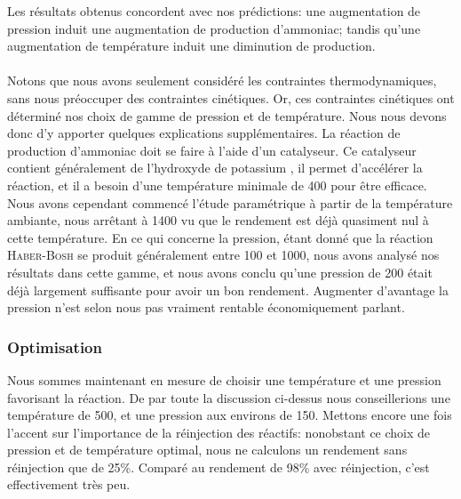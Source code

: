 Les résultats obtenus concordent avec nos prédictions: une augmentation de pression induit une augmentation de production d'ammoniac; tandis qu'une augmentation de température induit une
diminution de production.
\paragraph{} Notons que nous avons seulement considéré les contraintes thermodynamiques, sans nous préoccuper des contraintes
cinétiques. Or, ces contraintes cinétiques ont déterminé nos choix de gamme de pression et de température. Nous nous
devons donc d'y apporter quelques explications supplémentaires.
La réaction de production d'ammoniac doit se faire à l'aide d'un catalyseur. Ce catalyseur contient généralement de
l'hydroxyde de potassium , il permet d'accélérer la réaction, et il a besoin d'une température minimale de \unit{400}{\celsius}
pour être efficace.\cite{ib} Nous avons cependant commencé l'étude paramétrique à partir de la température ambiante, nous arrêtant à \unit{1400}{\kelvin} vu que le rendement est déjà quasiment nul à cette température.
En ce qui concerne la pression, étant donné que la réaction \textsc{Haber-Bosh} se produit généralement entre \unit{100}{\bbar} et \unit{1000}{\bbar},
nous avons analysé nos résultats dans cette gamme, et nous avons conclu qu'une pression de \unit{200}{\bbar} était déjà largement
suffisante pour avoir un bon rendement. Augmenter d'avantage la pression n'est selon nous pas vraiment rentable économiquement parlant.
\subsubsection{Optimisation}
Nous sommes maintenant en mesure de choisir une température et une pression favorisant la réaction. De par
toute la discussion ci-dessus nous conseillerions une température de \unit{500}{\celsius}, et une pression aux environs de \unit{150}{\bbar}. Mettons encore une fois l'accent sur l'importance de la réinjection des réactifs: nonobstant ce choix de pression et de température optimal, nous ne calculons un rendement sans réinjection que de 25\%. Comparé au rendement de 98\% avec réinjection, c'est effectivement très peu.
